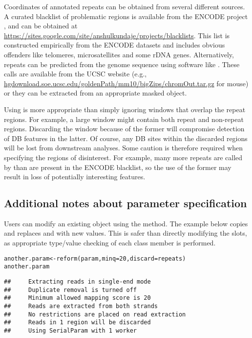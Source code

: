 \documentclass{report}\usepackage[]{graphicx}\usepackage[usenames,dvipsnames]{color}
\newcommand{\hlnum}[1]{\textcolor[rgb]{0.816,0.125,0.439}{#1}}%
\newcommand{\hlstd}[1]{\textcolor[rgb]{0.251,0.251,0.251}{#1}}%
\newcommand{\hlkwb}[1]{\textcolor[rgb]{0,0,0}{#1}}%
\newcommand{\hlkwc}[1]{\textcolor[rgb]{0.251,0.251,0.251}{#1}}%
\newcommand{\hlkwd}[1]{\textcolor[rgb]{0.878,0.439,0.125}{#1}}%
\newenvironment{knitrout}{}{} %
\begin{document}
Coordinates of annotated repeats can be obtained from several different sources.
A curated blacklist of problematic regions is available from the ENCODE project \cite{dunham2012}, and can be obtained at \url{https://sites.google.com/site/anshulkundaje/projects/blacklists}.
This list is constructed empirically from the ENCODE datasets and includes obvious offenders like telomeres, microsatellites and some rDNA genes.
Alternatively, repeats can be predicted from the genome sequence using software like .
These calls are available from the UCSC website (e.g., \url{hgdownload.soe.ucsc.edu/goldenPath/mm10/bigZips/chromOut.tar.gz} for mouse) or they can be extracted from an appropriate masked  object. 

Using  is more appropriate than simply ignoring windows that overlap the repeat regions.
For example, a large window might contain both repeat and non-repeat regions. 
Discarding the window because of the former will compromise detection of DB features in the latter. 
Of course, any DB sites within the discarded regions will be lost from downstream analyses.  
Some caution is therefore required when specifying the regions of disinterest.
For example, many more repeats are called by  than are present in the ENCODE blacklist, so the use of the former may result in loss of potentially interesting features.

\subsection{Additional notes about parameter specification}
Users can modify an existing  object using the  method.
The example below copies  and replaces  and  with new values.
This is safer than directly modifying the slots, as appropriate type/value checking of each class member is performed.

\begin{knitrout}
\color{fgcolor}\begin{kframe}
\begin{alltt}
\hlstd{another.param} \hlkwb{<-} \hlkwd{reform}\hlstd{(param,} \hlkwc{minq}\hlstd{=}\hlnum{20}\hlstd{,} \hlkwc{discard}\hlstd{=repeats)}
\hlstd{another.param}
\end{alltt}
\begin{verbatim}
##     Extracting reads in single-end mode
##     Duplicate removal is turned off 
##     Minimum allowed mapping score is 20 
##     Reads are extracted from both strands
##     No restrictions are placed on read extraction
##     Reads in 1 region will be discarded
##     Using SerialParam with 1 worker
\end{verbatim}
\end{kframe}
\end{knitrout}
\end{document}
